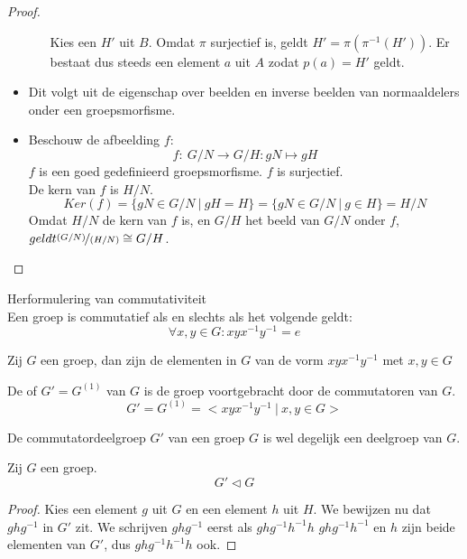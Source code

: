 \documentclass[main.tex]{subfiles}
\begin{document}
\begin{st}
\begin{proof}
\begin{itemize}
\begin{itemize}
        Kies een $H'$ uit $B$.
        Omdat $\pi$ surjectief is, \waarom geldt $H' = \pi(\pi^{-1}(H'))$.
        Er bestaat dus steeds een element $a$ uit $A$ zodat $p(a)=H'$ geldt. 
      \end{itemize}
    \item Dit volgt uit de eigenschap over beelden en inverse beelden van normaaldelers onder een groepsmorfisme. 
    \item Beschouw de afbeelding $f$:
      \[ f:\ G/N \rightarrow G/H: gN \mapsto gH \]
      $f$ is een goed gedefinieerd groepsmorfisme. \waarom
      $f$ is surjectief.\\ \waarom {}
      De kern van $f$ is $H/N$.
      \[ Ker(f) = \{ gN \in G/N \ |\ gH = H \} = \{ gN \in G/N \ |\ g \in H \} = H/N \]
      Omdat $H/N$ de kern van $f$ is, en $G/H$ het beeld van $G/N$ onder $f$, $geldt \nicefrac{(G/N)}{(H/N)} \cong G/H$.
    \end{itemize}
  \end{proof}
\end{st}

\begin{st}
  \label{st:herformulering-commutativiteit}
  Herformulering van commutativiteit\\
  Een groep is commutatief als en slechts als het volgende geldt:
  \[ \forall x,y \in G: xyx^{-1}y^{-1} = e \]
\end{st}

\begin{de}
  Zij $G$ een groep, dan zijn de elementen in $G$ van de vorm $xyx^{-1}y^{-1}$ met $x,y\in G$ 
\end{de}

\begin{de}
  De  of  $G' = G^{(1)}$ van $G$ is de groep voortgebracht door de commutatoren van $G$.
  \[ G' = G^{(1)} = < xyx^{-1}y^{-1} \ |\ x,y\in G > \]
\end{de}

\begin{st}
  \label{st:commutatordeelgroep-is-deelgroep}
  De commutatordeelgroep $G'$ van een groep $G$ is wel degelijk een deelgroep van $G$.
\end{st}

\begin{st}
  Zij $G$ een groep.
  \[ G' \triangleleft G \]

  \begin{proof}
    Kies een element $g$ uit $G$ en een element $h$ uit $H$.
    We bewijzen nu dat $ghg^{-1}$ in $G'$ zit.
    We schrijven $ghg^{-1}$ eerst als $ghg^{-1}h^{-1}h$
    $ghg^{-1}h^{-1}$ en $h$ zijn beide elementen van $G'$, dus $ghg^{-1}h^{-1}h$ ook.
  \end{proof}
\end{st}
\end{document}

